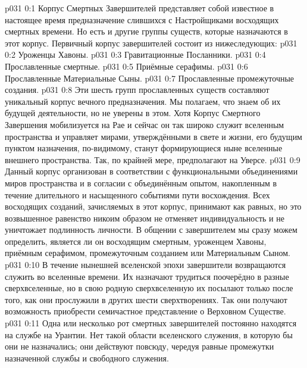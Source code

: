 \author{Божественный Советник и Не Имеющий Имени и Номера}
\vs p031 0:1 Корпус Смертных Завершителей представляет собой известное в настоящее время предназначение слившихся с Настройщиками восходящих смертных времени. Но есть и другие группы существ, которые назначаются в этот корпус. Первичный корпус завершителей состоит из нижеследующих:
\vs p031 0:2 Уроженцы Хавоны.
\vs p031 0:3 Гравитационные Посланники.
\vs p031 0:4 Прославленные смертные.
\vs p031 0:5 Приёмные серафимы.
\vs p031 0:6 Прославленные Материальные Сыны.
\vs p031 0:7 Прославленные промежуточные создания.
\vs p031 0:8 \pc Эти шесть групп прославленных существ составляют уникальный корпус вечного предназначения. Мы полагаем, что знаем об их будущей деятельности, но не уверены в этом. Хотя Корпус Смертного Завершения мобилизуется на Рае и сейчас он так широко служит вселенным пространства и управляет мирами, утверждёнными в свете и жизни, его будущим пунктом назначения, по\hyp{}видимому, станут формирующиеся ныне вселенные внешнего пространства. Так, по крайней мере, предполагают на Уверсе.
\vs p031 0:9 Данный корпус организован в соответствии с функциональными объединениями миров пространства и в согласии с объединённым опытом, накопленным в течение длительного и насыщенного событиями пути восхождения. Всех восходящих созданий, зачисляемых в этот корпус, принимают как равных, но это возвышенное равенство никоим образом не отменяет индивидуальность и не уничтожает подлинность личности. В общении с завершителем мы сразу можем определить, является ли он восходящим смертным, уроженцем Хавоны, приёмным серафимом, промежуточным созданием или Материальным Сыном.
\vs p031 0:10 В течение нынешней вселенской эпохи завершители возвращаются служить во вселенные времени. Их назначают трудиться поочерёдно в разные сверхвселенные, но в свою родную сверхвселенную их посылают только после того, как они прослужили в других шести сверхтворениях. Так они получают возможность приобрести семичастное представление о Верховном Существе.
\vs p031 0:11 Одна или несколько рот смертных завершителей постоянно находятся на службе на Урантии. Нет такой области вселенского служения, в которую бы они не назначались; они действуют повсюду, чередуя равные промежутки назначенной службы и свободного служения.
